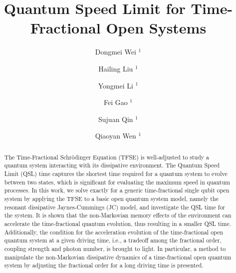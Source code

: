 \documentclass[
showpacs,  %
showkeys,  %
aps,       %
amsthm,    %
amsmath,   %
amsfonts,  %
amssymb    %
]{revtex4-1}          %
\begin{document}

\title{Quantum Speed Limit for Time-Fractional Open Systems}

\author{Dongmei Wei $^{1}$}

\author{Hailing Liu $^{1}$}

\author{Yongmei Li $^{1}$}

\author{Fei Gao $^{1}$}

\author{Sujuan Qin $^{1}$}

\author{Qiaoyan Wen $^{1}$}


\begin{abstract}
The Time-Fractional Schr\"{o}dinger Equation (TFSE) is well-adjusted to study a quantum system interacting with its dissipative environment. The Quantum Speed Limit (QSL) time captures the shortest time required for a quantum system to evolve between two states, which is significant for evaluating the maximum speed in quantum processes. In this work, we solve exactly for a generic time-fractional single qubit open system by applying the TFSE to a basic open quantum system model, namely the resonant dissipative Jaynes-Cummings (JC) model, and investigate the QSL time for the system. It is shown that the non-Markovian memory effects of the environment can accelerate the time-fractional quantum evolution, thus resulting in a smaller QSL time. Additionally, the condition for the acceleration evolution of the time-fractional open quantum system at a given driving time, i.e., a tradeoff among the fractional order, coupling strength and photon number, is brought to light. In particular, a method to manipulate the non-Markovian dissipative dynamics of a time-fractional open quantum system by adjusting the fractional order for a long driving time is presented.
\end{abstract}


\maketitle
\end{document}
